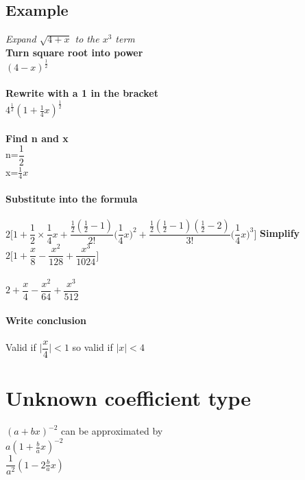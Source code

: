 \documentclass{article}[18pt]
\begin{document}
\subsection{Example}
\textit{Expand $\sqrt{4+x}$ to the $x^3$ term}\\
\textbf{Turn square root into power}\\
$(4-x)^{\frac{1}{2}}$\\
\\
\textbf{Rewrite with a 1 in the bracket}\\
$4^{\frac{1}{2}}(1+\frac{1}{4}x)^\frac{1}{2}$\\
\\
\textbf{Find n and x}\\
n=$\dfrac{1}{2}$\\
x=$\frac{1}{4}x$\\
\\
\textbf{Substitute into the formula}\\
\\
$2\Bigg[1+\dfrac{1}{2}\times\dfrac{1}{4}x+\dfrac{\frac{1}{2}(\frac{1}{2}-1)}{2!}\Bigg(\dfrac{1}{4}x\Bigg)^2+\dfrac{\frac{1}{2}(\frac{1}{2}-1)(\frac{1}{2}-2)}{3!}\Bigg(\dfrac{1}{4}x\Bigg)^3\Bigg]$
\newpage
\textbf{Simplify}\\
$2\Bigg[1+\dfrac{x}{8}-\dfrac{x^2}{128}+\dfrac{x^3}{1024}\Bigg]$\\
\\
$2+\dfrac{x}{4}-\dfrac{x^2}{64}+\dfrac{x^3}{512}$\\
\\
\textbf{Write conclusion}\\
\\
Valid if $\Big|\dfrac{x}{4}\Big|<1$ so valid if $|x|<4$
\section{Unknown coefficient type}
$(a+bx)^{-2}$ can be approximated by\\
$a(1+\frac{b}{a}x)^{-2}$\\
$\dfrac{1}{a^2}(1-2\frac{b}{a}x)$\\
\end{document}
